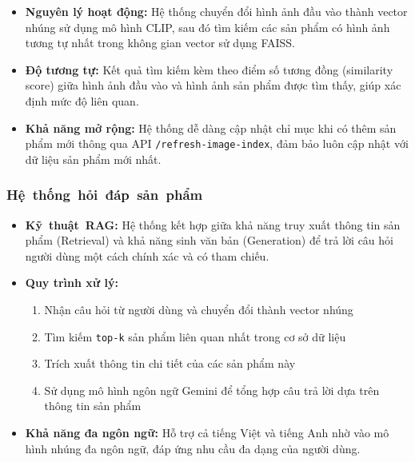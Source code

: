 \begin{itemize}
    \item \textbf{Nguyên lý hoạt động:} Hệ thống chuyển đổi hình ảnh đầu vào thành vector nhúng sử dụng mô hình CLIP, sau đó tìm kiếm các sản phẩm có hình ảnh tương tự nhất trong không gian vector sử dụng FAISS.
    
    \item \textbf{Độ tương tự:} Kết quả tìm kiếm kèm theo điểm số tương đồng (similarity score) giữa hình ảnh đầu vào và hình ảnh sản phẩm được tìm thấy, giúp xác định mức độ liên quan.
    
    \item \textbf{Khả năng mở rộng:} Hệ thống dễ dàng cập nhật chỉ mục khi có thêm sản phẩm mới thông qua API \texttt{/refresh-image-index}, đảm bảo luôn cập nhật với dữ liệu sản phẩm mới nhất.
\end{itemize}

\subsubsection{\mbox{Hệ thống hỏi đáp sản phẩm}}
\begin{itemize}
    \item \textbf{\mbox{Kỹ thuật RAG:}} Hệ thống kết hợp giữa khả năng truy xuất thông tin sản phẩm 
    (Retrieval) và khả năng sinh văn bản (Generation) để trả lời câu hỏi người dùng một cách 
    chính xác và có tham chiếu.
    
    \item \textbf{Quy trình xử lý:}
        \begin{enumerate}
            \item Nhận câu hỏi từ người dùng và chuyển đổi thành vector nhúng
            \item Tìm kiếm \texttt{top-k} sản phẩm liên quan nhất trong cơ sở dữ liệu
            \item Trích xuất thông tin chi tiết của các sản phẩm này
            \item Sử dụng mô hình ngôn ngữ Gemini để tổng hợp câu trả lời dựa trên thông tin sản phẩm
        \end{enumerate}
        
    \item \textbf{Khả năng đa ngôn ngữ:} Hỗ trợ cả tiếng Việt và tiếng Anh nhờ vào mô hình nhúng đa ngôn ngữ, đáp ứng nhu cầu đa dạng của người dùng.
\end{itemize}


